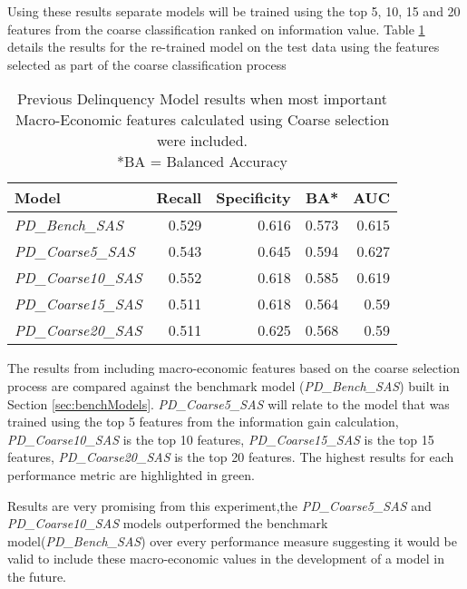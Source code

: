 Using these results separate models will be trained using the top 5, 10, 15 and 20 features from
the coarse classification ranked on information value. Table \ref{table:CoarsePDModelResults} details the results for the re-trained model
on the test data using the features selected as part of the coarse classification process

\begin{table}[H]
	\centering
	\small
	\begin{tabular}{l r r r r}
		\hline
		\textbf{Model} & \textbf{Recall} & \textbf{Specificity} & \textbf{BA*} & \textbf{AUC}  \\ \hline
		\textit{PD\_Bench\_SAS} & 0.529 & 0.616 & 0.573 & 0.615 \\ \hline
		\textit{PD\_Coarse5\_SAS}  & 0.543 & \cellcolor{green!25}0.645 & \cellcolor{green!25}0.594 & \cellcolor{green!25}0.627   \\ 
		\textit{PD\_Coarse10\_SAS} & \cellcolor{green!25}0.552 & 0.618 & 0.585 & 0.619  \\ 
		\textit{PD\_Coarse15\_SAS} & 0.511 & 0.618 & 0.564 & 0.59  \\
		\textit{PD\_Coarse20\_SAS} & 0.511 & 0.625 & 0.568 & 0.59  \\\hline 
	\end{tabular}
	\caption{Previous Delinquency Model results when most important\\
		Macro-Economic features calculated using Coarse selection were included.
		\\ *BA = Balanced Accuracy}
	\label{table:CoarsePDModelResults}
\end{table}

The results from including macro-economic features based on the coarse selection process are compared against the benchmark model (\textit{PD\_Bench\_SAS}) built in Section \ref{sec:benchModels}. \textit{PD\_Coarse5\_SAS} will relate to the model that was trained using the top 5 features from the information gain calculation, \textit{PD\_Coarse10\_SAS} is the top 10 features, \textit{PD\_Coarse15\_SAS} is the top 15 features, \textit{PD\_Coarse20\_SAS} is the top 20 features. The highest results for each performance metric are highlighted in green.

Results are very promising from this experiment,the \textit{PD\_Coarse5\_SAS} and \textit{PD\_Coarse10\_SAS} models outperformed the benchmark model(\textit{PD\_Bench\_SAS}) over every performance measure suggesting it would be valid to include these macro-economic values in the development of a model in the future. 

